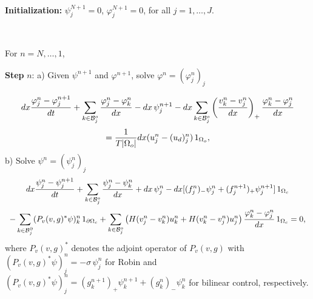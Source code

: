 \documentclass[11pt]{article}
\def \hueco{\noalign{\medskip}}
\def \beq{\begin{equation}}
\def \eeq{\end{equation}}
\def \ba{\begin{array}}
\def \ea{\end{array}}
\def \dis{\displaystyle}
\numberwithin{theorem}{section}
\begin{document}
\

{\bf Initialization:} $\psi_j^{N+1}=0$, $\varphi_j^{N+1}= 0 $, for all $j=1,\dots,J$. 

\

For $n=N,\dots,1$,

{\bf Step} $n$: a)  Given $\psi^{n+1}$ and $\varphi^{n+1}$,  solve  
$\varphi^{n}=(\varphi_j^{n})_j$

\beq\label{eq:schemevarphi}
\ba{c}\dis
dx\frac{\varphi_j^n-\varphi_j^{n+1}}{dt}
+ \sum_{k\in {\cal B}_j^o } \frac{\varphi_{j}^n -\varphi_k^n}{dx}
  - dx\,\psi_j^{n+1}  
 -dx \sum_{k\in {\cal B}_j^o } 
\left(\frac{v_{k}^n-v_j^n}{dx}\right)_+\frac{\varphi_{k}^n-\varphi_j^n}{dx}
\\ \hueco\dis
= \frac{1}{T|\Omega_o|}dx(u_j^n-(u_d)_j^n)\, 1_{\Omega_o},
\ea
\eeq
b) Solve $\psi^{n}=(\psi_j^{n})_j$
\beq\label{eq:schemepsi}
\ba{c}\dis
dx\frac{\psi_j^n-\psi_j^{n+1}}{dt}
+\sum_{k\in {\cal B}_j^o }\frac{\psi_{j}^n-\psi_k^n}{dx}
+ dx \, \psi_j^n
-dx[(f_j^n)_-\psi_j^n + (f_j^{n+1})_+\psi_j^{n+1}] \, 1_{\Omega_c}
\\ \hueco\dis
- \sum_{k\in {\cal B}_j^\partial }(P_v(v,g)^* \psi)^n_k \, 1_{\partial\Omega_c}
+ \sum_{k\in {\cal B}_j^o } \left(H(v_j^n-v_{k}^n)u_{k}^n+H(v_{k}^n-v_j^n)u_j^n\right) 
\frac{\varphi_{k}^n-\varphi_j^n}{dx} \, 1_{\Omega_c}
=0,
\ea
\eeq
%
where $P_v(v,g)^*$ denotes the adjoint operator of $P_v(v,g)$ with 
$(P_v(v,g)^* \psi)^n_j=-\sigma\, \psi^n_j$ for Robin and  
$(P_v(v,g)^* \psi)^n_j=(g^{n+1}_k)_+ \psi^{n+1}_k + (g^n_k)_- \psi^{n}_k$ for bilinear control, respectively.
\end{document}

